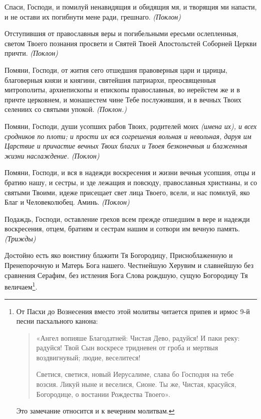 Спаси, Господи, и помилуй ненавидящия и обидящия мя, и творящия ми напасти, и не остави их погибнути мене ради, грешнаго. \itshape (Поклон)\normalfont{}

Отступившия от православныя веры и погибельными ересьми ослепленныя, светом Твоего познания просвети и Святей Твоей Апостольстей Соборней Церкви причти. \itshape (Поклон) \normalfont{}



Помяни, Господи, от жития сего отшедшия правоверныя цари и царицы, благоверныя князи и княгини, святейшия патриархи, преосвященныя митрополиты, архиепископы и епископы православныя, во иерейстем же и в причте церковнем, и монашестем чине Тебе послужившия, и в вечных Твоих селениих со святыми упокой. \itshape (Поклон.)\normalfont{} 

Помяни, Господи, души усопших рабов Твоих, родителей моих \itshape (имена их)\normalfont{}, и всех сродников по плоти; и прости их вся согрешения вольная и невольная, даруя им Царствие и причастие вечных Твоих благих и Твоея безконечныя и блаженныя жизни наслаждение. \itshape (Поклон) \normalfont{}

Помяни, Господи, и вся в надежди воскресения и жизни вечныя усопшия, отцы и братию нашу, и сестры, и зде лежащия и повсюду, православныя христианы, и со святыми Твоими, идеже присещает свет лица Твоего, всели, и нас помилуй, яко Благ и Человеколюбец. Аминь. \itshape (Поклон) \normalfont{}

Подаждь, Господи, оставление грехов всем прежде отшедшим в вере и надежди воскресения, отцем, братиям и сестрам нашим и сотвори им вечную память. \itshape (Трижды)\normalfont{}



Достойно есть яко воистину блажити Тя Богородицу, Присноблаженную и Пренепорочную и Матерь Бога нашего. Честнейшую Херувим и славнейшую без сравнения Серафим, без истления Бога Слова рождшую, сущую Богородицу Тя величаем\footnote{От Пасхи до Вознесения вместо этой молитвы читается припев и ирмос 9-й песни пасхального канона: 

\begin{quote}

«Ангел вопияше Благодатней: Чистая Дево, радуйся! И паки реку: радуйся! Твой Сын воскресе тридневен от гроба и мертвыя воздвигнувый; людие, веселитеся! 

Светися, светися, новый Иерусалиме, слава бо Господня на тебе возсия. Ликуй ныне и веселися, Сионе. Ты же, Чистая, красуйся, Богородице, о востании Рождества Твоего».

\end{quote}

Это замечание относится и к вечерним молитвам. }.

